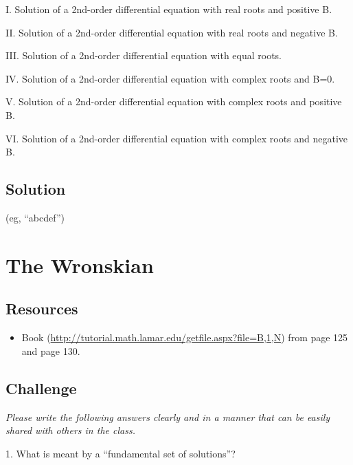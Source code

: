 I. Solution of a 2nd-order differential equation with real roots and positive B.

II. Solution of a 2nd-order differential equation with real roots and negative B.


III. Solution of a 2nd-order differential equation with equal roots.

IV. Solution of a 2nd-order differential equation with complex roots and B=0.

V. Solution of a 2nd-order differential equation with complex roots and positive B.

VI. Solution of a 2nd-order differential equation with complex roots and negative B.

\vspace{1em}

\subsection*{Solution}
(eg, ``abcdef'')


\timebox




\newpage
\section{The Wronskian}

\subsection*{Resources}
\begin{itemize}
    \item Book (\url{http://tutorial.math.lamar.edu/getfile.aspx?file=B,1,N}) from page 125 and page 130.
\end{itemize}

\subsection*{Challenge}

\emph{Please write the following answers clearly and in a manner that can be easily shared with others in the class.}

1. What is meant by a ``fundamental set of solutions''?

